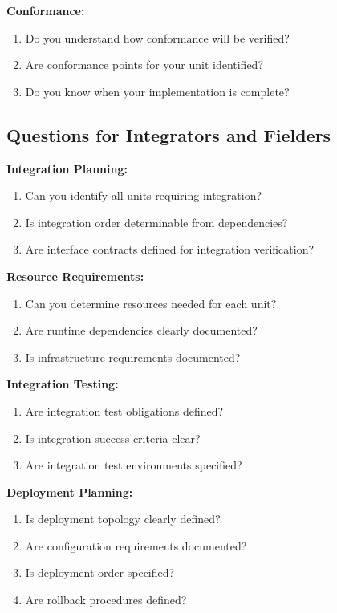 \documentclass[11pt]{article}
\begin{document}
\begin{questionbox}
\textbf{Conformance:}
\begin{enumerate}[resume]
    \item Do you understand how conformance will be verified?
    \item Are conformance points for your unit identified?
    \item Do you know when your implementation is complete?
\end{enumerate}
\end{questionbox}

\subsection{Questions for Integrators and Fielders}

\begin{questionbox}

\textbf{Integration Planning:}
\begin{enumerate}
    \item Can you identify all units requiring integration?
    \item Is integration order determinable from dependencies?
    \item Are interface contracts defined for integration verification?
\end{enumerate}

\textbf{Resource Requirements:}
\begin{enumerate}[resume]
    \item Can you determine resources needed for each unit?
    \item Are runtime dependencies clearly documented?
    \item Is infrastructure requirements documented?
\end{enumerate}

\textbf{Integration Testing:}
\begin{enumerate}[resume]
    \item Are integration test obligations defined?
    \item Is integration success criteria clear?
    \item Are integration test environments specified?
\end{enumerate}

\textbf{Deployment Planning:}
\begin{enumerate}[resume]
    \item Is deployment topology clearly defined?
    \item Are configuration requirements documented?
    \item Is deployment order specified?
    \item Are rollback procedures defined?
\end{enumerate}


\end{questionbox}
\end{document}
